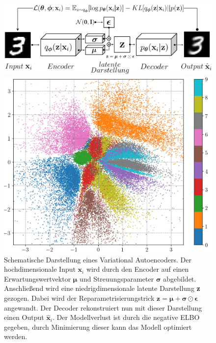 \documentclass[12pt]{article}
\begin{document}
	\begin{figure}[h!]
	\centering
	\includegraphics[scale=0.41]{VAE-Modell}
	\captionsetup{labelformat=empty}
	\caption{Schematische Darstellung eines Variational Autoencoders. Der hochdimensionale Input $\mathbf{x}_i$ wird durch den Encoder auf einen Erwartungswertvektor $\boldsymbol{\mu}$ und Streuungsparameter $\boldsymbol{\sigma}$ abgebildet. Anschließend wird eine niedrigdimensionale latente Darstellung \textbf{z} gezogen. Dabei wird der Reparametrisierungstrick $\textbf{z}=\boldsymbol{\mu}+\boldsymbol{\sigma} \odot \boldsymbol{\epsilon}$ angewandt. Der Decoder rekonstruiert nun mit dieser Darstellung einen Output $\hat{\mathbf{x}}_i$. Der Modellverlust ist durch die negative ELBO gegeben, durch Minimierung dieser kann das Modell optimiert werden.\\}
	\centering
	\begin{minipage}{.5\textwidth}
		\centering
		\includegraphics[scale=0.43]{latent_space_2D}
	\end{minipage}%
	\begin{minipage}{.5\textwidth}

\end{minipage}
\end{figure}
\end{document}
